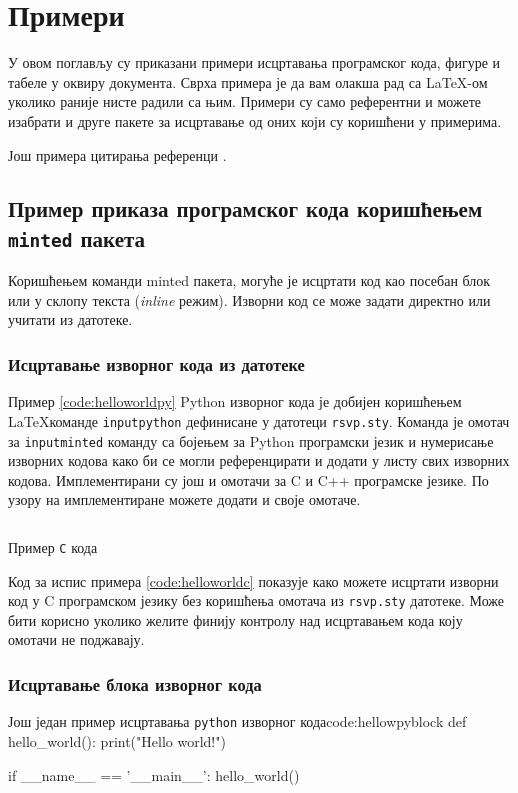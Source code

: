 \section{Примери}
У овом поглављу су приказани примери исцртавања програмског кода, фигуре и табеле у оквиру документа. Сврха примера је да вам олакша рад са \LaTeX-ом уколико раније нисте радили са њим. Примери су само референтни и можете изабрати и друге пакете за исцртавање од оних који су коришћени у примерима.

Још примера цитирања референци \cite{kamran2101rv, yatsura2021metalearning}.


\subsection{Пример приказа програмског кода коришћењем \texttt{minted} пакета}
Коришћењем команди minted пакета, могуће је исцртати код као посебан блок или у склопу текста (\textit{inline} режим). Изворни код се може задати директно или учитати из датотеке.

\subsubsection{Исцртавање изворног кода из датотеке}
Пример \ref{code:helloworldpy} Python изворног кода је добијен коришћењем \LaTeX команде \texttt{inputpython} дефинисане у датотеци \texttt{rsvp.sty}. Команда је омотач за \texttt{inputminted} команду са бојењем за Python програмски језик и нумерисање изворних кодова како би се могли референцирати и додати у листу свих изворних кодова. Имплементирани су још и омотачи за C и C++ програмске језике. По узору на имплементиране можете додати и своје омотаче. 

\begin{listing}
\inputminted{c}{kodovi/helloworld.c}
\caption{Пример \texttt{C} кода}
\label{code:helloworldc}
\end{listing}
Код за испис примера \ref{code:helloworldc} показује како можете исцртати изворни код у C програмском језику без коришћења омотача из \texttt{rsvp.sty} датотеке. Може бити корисно уколико желите финију контролу над исцртавањем кода коју омотачи не поджавају.

\subsubsection{Исцртавање блока изворног кода}
\begin{pythoncode}{Још један пример исцртавања \texttt{python} изворног кода}{code:hellowpyblock}
def hello_world():
    print("Hello world!")


if __name__ == '__main__':
    hello_world()
\end{pythoncode}

